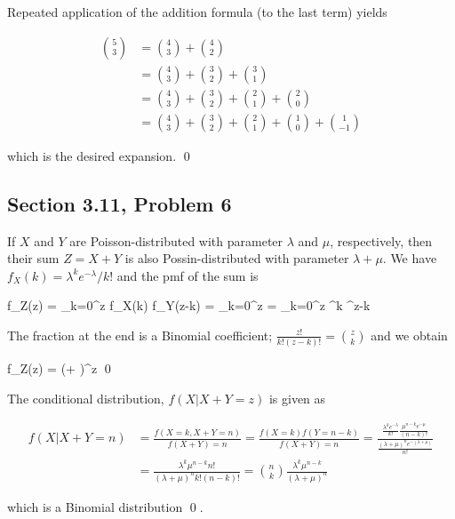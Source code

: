 Repeated application of the addition formula (to the last term) yields

\begin{align*}
  {5 \choose 3} &= {4 \choose 3} + {4 \choose 2} \\
   \            &= {4 \choose 3} + {3 \choose 2} + {3 \choose 1} \\
                &= {4 \choose 3} + {3 \choose 2} + {2 \choose 1} + {2 \choose 0} \\
                &= {4 \choose 3} + {3 \choose 2} + {2 \choose 1} + {1 \choose 0} + {1 \choose -1}
\end{align*}

which is the desired expansion. \qed


\subsection{Section 3.11, Problem 6}

If $X$ and $Y$ are Poisson-distributed with parameter $\lambda$ and $\mu$, respectively, then their sum $Z = X+Y$ is also Possin-distributed with parameter $\lambda + \mu$. We have $f_X(k) = \lambda^k e^{-\lambda}/k!$ and the pmf of the sum is

\bee
f_Z(z) = \sum_{k=0}^z f_X(k) f_Y(z-k) = \sum_{k=0}^z   =  \sum_{k=0}^z \lambda^k \mu^{z-k} 
\eee

The fraction at the end is a Binomial coefficient; $\frac{z!}{k!(z-k)!} = {z \choose k}$ and we obtain

\bee
f_Z(z) =  (\lambda + \mu)^z \qed
\eee

The conditional distribution, $f(X|X+Y=z)$ is given as

\begin{align*}
f(X|X+Y=n) &= \frac{f(X=k, X+Y=n)}{f(X+Y)=n} = \frac{f(X=k) f(Y = n-k)}{f(X+Y)=n} = \frac{ \frac{\lambda^k e^{-\lambda} }{k!} \frac{\mu^{n-k} e^{-\mu} }{(n-k)!} }{ \frac{(\lambda + \mu)^n e^{-(\lambda+\mu)}}{n!} } \\ &= \frac{\lambda^k \mu^{n-k} n!}{(\lambda+\mu)^n k! (n-k)!} = {n \choose k} \frac{\lambda^k \mu^{n-k}}{(\lambda+\mu)^n}
\end{align*}

which is a Binomial distribution \qed.

